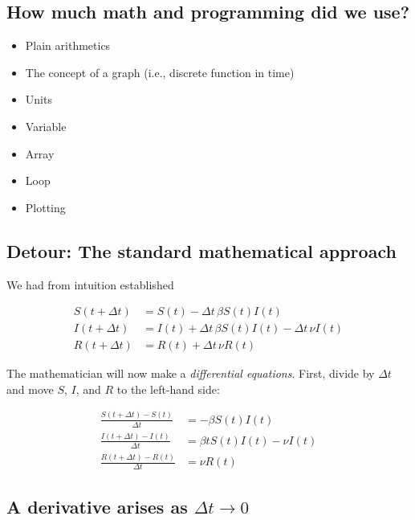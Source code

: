 \documentclass[%
twoside,                 %
final,                   %
10pt]{article}
\begin{document}
\subsection{How much math and programming did we use?}

\begin{itemize}
 \item Plain arithmetics

 \item The concept of a graph (i.e., discrete function in time)

 \item Units

 \item Variable

 \item Array

 \item Loop

 \item Plotting
\end{itemize}

\noindent
\subsection{Detour: The standard mathematical approach}

We had from intuition established

\begin{align*}
S(t+\Delta t) &= S(t) - \Delta t\,\beta S(t)I(t)\\
I(t+\Delta t) &= I(t) + \Delta t\,\beta S(t)I(t) -\Delta t\,\nu I(t)\\
R(t+\Delta t) &= R(t) + \Delta t\,\nu R(t)
\end{align*}

The mathematician will now make a \emph{differential equations}. First,
divide by $\Delta t$ and move $S$, $I$, and $R$ to the left-hand side:

\begin{align*}
\frac{S(t+\Delta t) - S(t)}{\Delta t} &= - \beta S(t)I(t)\\
\frac{I(t+\Delta t) - I(t)}{\Delta t} &= \beta t S(t)I(t) -\nu I(t)\\
\frac{R(t+\Delta t) - R(t)}{\Delta t} &= \nu R(t)
\end{align*}

\subsection{A derivative arises as $\Delta t\rightarrow 0$}
\end{document}
